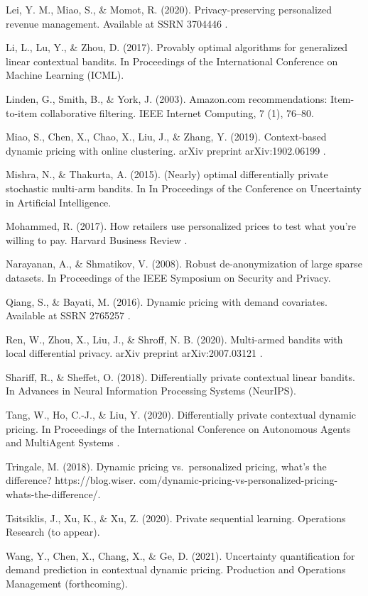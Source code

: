 Lei, Y. M., Miao, S., \& Momot, R. (2020). Privacy-preserving personalized revenue management. Available at SSRN 3704446 .

Li, L., Lu, Y., \& Zhou, D. (2017). Provably optimal algorithms for generalized linear contextual bandits. In Proceedings of the International Conference on Machine Learning (ICML).

Linden, G., Smith, B., \& York, J. (2003). Amazon.com recommendations: Item-to-item collaborative filtering. IEEE Internet Computing, 7 (1), 76--80.

Miao, S., Chen, X., Chao, X., Liu, J., \& Zhang, Y. (2019). Context-based dynamic pricing with online clustering. arXiv preprint arXiv:1902.06199 .

Mishra, N., \& Thakurta, A. (2015). (Nearly) optimal differentially private stochastic multi-arm bandits. In In Proceedings of the Conference on Uncertainty in Artificial Intelligence.

Mohammed, R. (2017). How retailers use personalized prices to test what you're willing to pay. Harvard Business Review .

Narayanan, A., \& Shmatikov, V. (2008). Robust de-anonymization of large sparse datasets. In Proceedings of the IEEE Symposium on Security and Privacy.

Qiang, S., \& Bayati, M. (2016). Dynamic pricing with demand covariates. Available at SSRN 2765257 .

Ren, W., Zhou, X., Liu, J., \& Shroff, N. B. (2020). Multi-armed bandits with local differential privacy. arXiv preprint arXiv:2007.03121 .

Shariff, R., \& Sheffet, O. (2018). Differentially private contextual linear bandits. In Advances in Neural Information Processing Systems (NeurIPS).

Tang, W., Ho, C.-J., \& Liu, Y. (2020). Differentially private contextual dynamic pricing. In Proceedings of the International Conference on Autonomous Agents and MultiAgent Systems .

Tringale, M. (2018). Dynamic pricing vs.~personalized pricing, what's the difference? https://blog.wiser. com/dynamic-pricing-vs-personalized-pricing-whats-the-difference/.

Tsitsiklis, J., Xu, K., \& Xu, Z. (2020). Private sequential learning. Operations Research (to appear).

Wang, Y., Chen, X., Chang, X., \& Ge, D. (2021). Uncertainty quantification for demand prediction in contextual dynamic pricing. Production and Operations Management (forthcoming).


